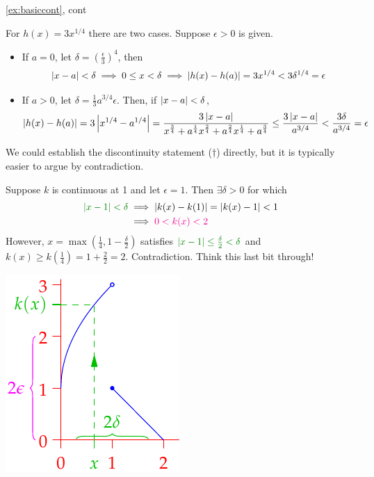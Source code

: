 \begin{examples*}{\ref{ex:basiccont}, cont}{}
\begin{enumerate}
	  \item For $h(x)=3x^{1/4}$ there are two cases. Suppose $\epsilon>0$ is given.
	  \begin{itemize}
	    \item If $a=0$, let $\delta=\left(\frac\epsilon 3\right)^4$, then\footnotemark{}
	  	\begin{align*}
	  		\left| x-a\right|<\delta\implies 0\le x<\delta\implies \left| h(x)-h(a)\right|=3x^{1/4}<3\delta^{1/4}=\epsilon
	  	\end{align*}
	    \item If $a>0$, let $\delta=\frac 13a^{3/4}\epsilon$. Then, if $\left| x-a\right|<\delta$,
	    \[
	    	\left| h(x)-h(a)\right| =3\left| x^{1/4}-a^{1/4}\right|
	    	=\frac{3\left| x-a\right|}{x^{\frac 34} +a^{\frac 14}x^{\frac 24}
	    		+a^{\frac 24}x^{\frac 14} +a^{\frac 34}} 
	    	\le\frac{3\left| x-a\right|}{a^{3/4}}
	    	<\frac{3\delta}{a^{3/4}} 
	    	=\epsilon
	    \]
	  \end{itemize}
    
  	\begin{minipage}[t]{0.72\linewidth}\vspace{0pt}
	  	\item\label{ex:edkdiscont} We could establish the discontinuity statement ($\dag$) directly, but it is typically easier to argue by contradiction.\par
	  	Suppose $k$ is continuous at 1 and let $\epsilon=1$. Then $\exists\delta>0$ for which
	  	\begin{align*}
			  \textcolor{Green}{\nm{x-1}<\delta}&\implies \nm{k(x)-k(1)}=\nm{k(x)-1}<1\\
			  &\implies \textcolor{magenta}{0<k(x)<2}
		  \end{align*}
	  	However, $x=\max(\frac 14,1-\frac\delta 2)$ satisfies $\textcolor{Green}{\nm{x-1}\le \frac\delta 2<\delta}$ and $k(x)\ge k(\frac 14)=1+\frac 22=2$. Contradiction. Think this last bit through!
	  \end{minipage}
	  \hfill
	  \begin{minipage}[t]{0.27\linewidth}\vspace{-2pt}
	  	\flushright\includegraphics[scale=0.9]{cont-ex3}
	  \end{minipage}
	  
  \end{enumerate}
\end{examples*}

